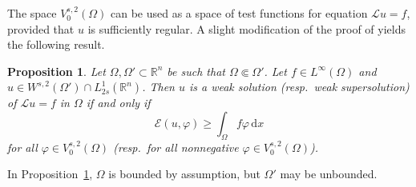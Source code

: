 \documentclass[11pt]{amsart}
\theoremstyle{plain}
\newtheorem{proposition}[theorem]{Proposition}
\theoremstyle{definition}
\numberwithin{equation}{section}
\begin{document}
The space $V^{s, 2}_0(\Omega)$ can be used as a space of test functions for equation $\mathcal{L}u=f$, provided that $u$ is sufficiently regular. A slight modification of the proof of \cite[Proposition~2.4]{BBK24} yields the following result.

\begin{proposition}\label{prop-test}
Let $\Omega, \Omega' \subset \mathbb{R}^n$ be such that $\Omega \Subset \Omega'$. Let $f \in L^\infty(\Omega)$ and $u \in W^{s, 2}(\Omega') \cap L^1_{2s}(\mathbb{R}^n)$. Then $u$ is a weak solution (resp.\ weak supersolution) of $\mathcal{L}u=f$ in $\Omega$ if and only if
\begin{equation*}
\mathcal{E}(u, \varphi) \geq \int_\Omega f\varphi \,\mathrm{d}x
\end{equation*}
for all $\varphi \in V^{s, 2}_0(\Omega)$ \textup{(}resp.\ for all nonnegative $\varphi \in V^{s, 2}_0(\Omega)$\textup{)}.
\end{proposition}

In Proposition~\ref{prop-test}, $\Omega$ is bounded by assumption, but $\Omega'$ may be unbounded.
\end{document}
